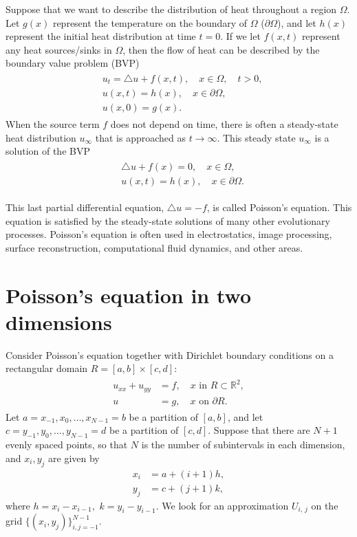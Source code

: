 \label{lab:poisson2d}
 
Suppose that we want to describe the distribution of heat throughout a region $\Omega$.
Let $g(x)$ represent the temperature on the boundary of $\Omega$ ($\partial \Omega$), and let $h(x)$ represent the initial heat distribution at time $t = 0$.
If we let $f(x,t)$ represent any heat sources/sinks in $\Omega$, then the flow of heat can be described by the boundary value problem (BVP)
\begin{align}
	\begin{split}
		& { } u_t = \triangle u + f(x,t), \quad x \in \Omega, \quad t >0,\\
		& { }u(x,t) = h(x), \quad x \in \partial \Omega, \\
		& { }u(x,0) = g(x).
	\end{split}
\end{align}
When the source term $f$ does not depend on time, there is often a steady-state heat distribution $u_{\infty}$ that is approached as $t \to \infty$.
This steady state $u_{\infty}$ is a solution of the BVP
\begin{align}
	\begin{split}
		& { }  \triangle u + f(x) = 0, \quad x \in \Omega,\\
		& { }u(x,t) = h(x), \quad x \in \partial \Omega.
	\end{split}
\end{align}

This last partial differential equation, $\triangle u = -f$, is called Poisson's equation.
This equation is satisfied by the steady-state solutions of many other evolutionary processes.
Poisson's equation is often used in electrostatics, image processing, surface reconstruction, computational fluid dynamics, and other areas. 


\section*{Poisson's equation in two dimensions}
 Consider Poisson's equation together with Dirichlet boundary conditions on a rectangular  domain $R = [a,b] \times [c,d]$:
 \begin{align}
	\begin{split}
 	u_{xx} + u_{yy} &= f,\quad x \text{ in } R \subset \mathbb{R}^2,\\
 	u &= g, \quad x \text{ on } \partial R.
	\end{split}\label{eqn:2d_poisson}
\end{align}
Let $a = x_{-1}, x_0, \ldots, x_{N-1} = b$ be a partition of $[a,b]$, and let $c = y_{-1}, y_0, \ldots, y_{N-1} = d$ be a partition of $[c,d]$.
Suppose that there are $N+1$ evenly spaced points, so that $N$ is the number of subintervals in each dimension, and $x_i, y_j$ are given by 
\begin{align*}
	x_i &= a + (i+1)h, \\
	y_j &= c + (j+1)k,
\end{align*}
where $h = x_i-x_{i-1},$ $k = y_i-y_{i-1}$.
We look for an approximation $U_{i,\,j}$ on the grid $\{(x_{i},y_{j})\}_{i,j=-1}^{N-1}$.

